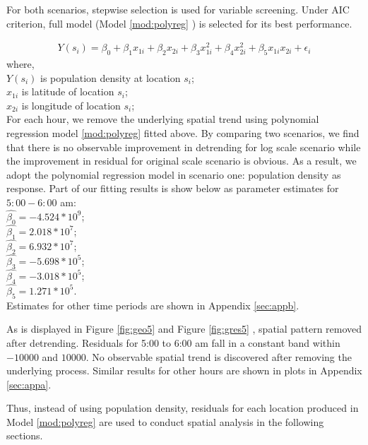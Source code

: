 \documentclass[hidelinks,12pt]{article}
\begin{document}
	For both scenarios, stepwise selection is used for variable screening. Under AIC criterion, full model (Model \ref{mod:polyreg} ) is selected for its best performance.
	
	\begin{align}
	\label{mod:polyreg}
	Y(s_i)=\beta_0 +\beta_1x_{1i} +\beta_2x_{2i} +\beta_3x_{1i}^2 +\beta_4x_{2i}^2+\beta_5x_{1i}x_{2i}+\epsilon_i
	\end{align}
	where,\\
	$Y(s_i)$ is population density at location $s_i$;\\
	$x_{1i}$ is latitude of location $s_i$;\\
	$x_{2i}$ is longitude of location $s_i$;\\	
	
	For each hour, we remove the underlying spatial trend using polynomial regression model \ref{mod:polyreg} fitted above. By comparing two scenarios, we find that there is no observable improvement in detrending for log scale scenario while the improvement in residual for original scale scenario is obvious. As a result, we adopt the polynomial regression model in scenario one: population density as response. Part of our fitting results is show below as parameter estimates for $5:00-6:00$ am:\\
	\indent $\hat{\beta_0}=-4.524*10^9$;\\
	\indent$\hat{\beta_1}=2.018*10^7$;\\
	\indent$\hat{\beta_2}=6.932*10^7$;\\
	\indent$\hat{\beta_3}=-5.698*10^5$;\\
	\indent$\hat{\beta_4}=-3.018*10^5$;\\
	\indent$\hat{\beta_5}=1.271*10^5$.\\
	Estimates for other time periods are shown in Appendix \ref{sec:appb}.
	
	As is displayed in Figure \ref{fig:geo5} and Figure \ref{fig:gres5} , spatial pattern removed after detrending. Residuals for 5:00 to 6:00 am fall in a constant band within $-10000$ and  $10000$. No observable spatial trend is discovered after removing the underlying process. Similar results for other hours are shown in plots in Appendix \ref{sec:appa}.
	
	Thus, instead of using population density, residuals for each location produced in Model \ref{mod:polyreg} are used to conduct spatial analysis in the following sections.
	
\end{document}
